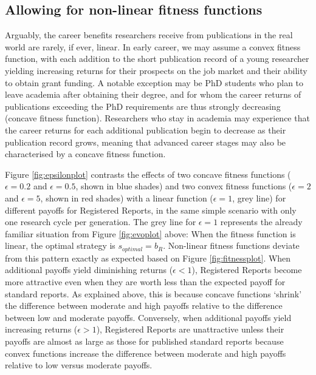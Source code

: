 \documentclass[
  ,man,mask,floatsintext]{apa6}
\begin{document}
\hypertarget{allowing-for-non-linear-fitness-functions}{%
\subsection{Allowing for non-linear fitness functions}\label{allowing-for-non-linear-fitness-functions}}

Arguably, the career benefits researchers receive from publications in the real world are rarely, if ever, linear.
In early career, we may assume a convex fitness function, with each addition to the short publication record of a young researcher yielding increasing returns for their prospects on the job market and their ability to obtain grant funding.
A notable exception may be PhD students who plan to leave academia after obtaining their degree, and for whom the career returns of publications exceeding the PhD requirements are thus strongly decreasing (concave fitness function).
Researchers who stay in academia may experience that the career returns for each additional publication begin to decrease as their publication record grows, meaning that advanced career stages may also be characterised by a concave fitness function.

Figure \ref{fig:epsilonplot} contrasts the effects of two concave fitness functions (\(\epsilon = 0.2\) and \(\epsilon = 0.5\), shown in blue shades) and two convex fitness functions (\(\epsilon = 2\) and \(\epsilon = 5\), shown in red shades) with a linear function (\(\epsilon = 1\), grey line) for different payoffs for Registered Reports, in the same simple scenario with only one research cycle per generation.
The grey line for \(\epsilon = 1\) represents the already familiar situation from Figure \ref{fig:evoplot} above:
When the fitness function is linear, the optimal strategy is \(s_{optimal} = b_{R}\).
Non-linear fitness functions deviate from this pattern exactly as expected based on Figure \ref{fig:fitnessplot}.
When additional payoffs yield diminishing returns (\(\epsilon <1\)), Registered Reports become more attractive even when they are worth less than the expected payoff for standard reports.
As explained above, this is because concave functions `shrink' the difference between moderate and high payoffs relative to the difference between low and moderate payoffs.
Conversely, when additional payoffs yield increasing returns (\(\epsilon > 1\)), Registered Reports are unattractive unless their payoffs are almost as large as those for published standard reports because convex functions increase the difference between moderate and high payoffs relative to low versus moderate payoffs.
\end{document}
